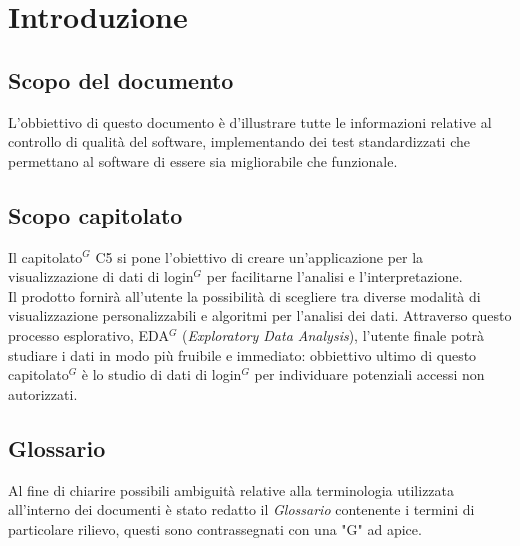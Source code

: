 \section{Introduzione}

\subsection{Scopo del documento}

L'obbiettivo di questo documento è d'illustrare tutte le informazioni relative al controllo di qualità del software, implementando dei test standardizzati che permettano al software di essere sia migliorabile che funzionale.

\subsection{Scopo capitolato}
Il capitolato$^{G}$ C5 si pone l'obiettivo di creare un'applicazione per la visualizzazione di dati
di login$^{G}$ per facilitarne l'analisi e l'interpretazione.\\
Il prodotto fornirà all'utente la possibilità di scegliere tra diverse modalità di visualizzazione personalizzabili 
e algoritmi per l'analisi dei dati. Attraverso questo processo esplorativo, EDA$^{G}$ (\textit{Exploratory Data Analysis}), 
l'utente finale potrà studiare i dati in modo più fruibile e immediato: obbiettivo ultimo di questo capitolato$^{G}$ 
è lo studio di dati di login$^{G}$ per individuare potenziali accessi non autorizzati.

\subsection{Glossario}
Al fine di chiarire possibili ambiguità relative alla terminologia utilizzata all'interno dei
documenti è stato redatto il \textit{Glossario} contenente i termini di particolare rilievo, questi
sono contrassegnati con una "G" ad apice.
\newpage